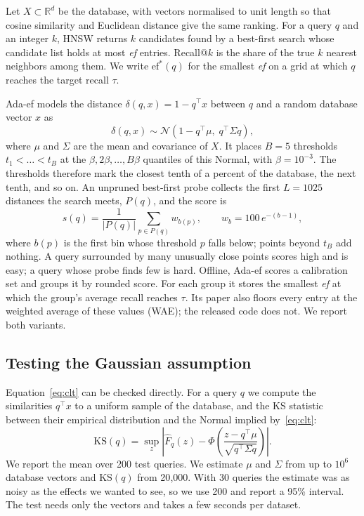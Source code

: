 \documentclass[10pt,journal,compsoc]{IEEEtran}
\makeatletter
\newcommand{\ef}{\textit{ef}}
\newcommand{\KS}{\mathrm{KS}}
\renewcommand\paragraph{\@startsection{paragraph}{4}{\z@}{1.5ex plus 1ex minus .2ex}{-1em}{\normalfont\normalsize\itshape}}
\makeatother
\begin{document}
Let $X \subset \mathbb{R}^d$ be the database, with vectors normalised to unit length so that
cosine similarity and Euclidean distance give the same ranking. For a query $q$ and an integer $k$,
HNSW returns $k$ candidates found by a best-first search whose candidate list holds at most \ef{}
entries. Recall@$k$ is the share of the true $k$ nearest neighbors among them. We write
$\mathrm{ef}^*(q)$ for the smallest \ef{} on a grid at which $q$ reaches the target recall $\tau$.

\paragraph{Ada-ef's score.}
Ada-ef models the distance $\delta(q,x) = 1 - q^\top x$ between $q$ and a random database vector
$x$ as
\begin{equation}
  \delta(q,x) \sim \mathcal{N}\!\left(1 - q^\top\mu,\; q^\top \Sigma q\right),
  \label{eq:clt}
\end{equation}
where $\mu$ and $\Sigma$ are the mean and covariance of $X$. It places $B = 5$ thresholds
$t_1 < \dots < t_B$ at the $\beta, 2\beta, \dots, B\beta$ quantiles of this Normal, with
$\beta = 10^{-3}$. The thresholds therefore mark the closest tenth of a percent of the database, the
next tenth, and so on. An unpruned best-first probe collects the first $L = 1025$ distances the
search meets, $P(q)$, and the score is
\begin{equation}
  s(q) = \frac{1}{|P(q)|} \sum_{p \in P(q)} w_{b(p)}, \qquad w_b = 100\, e^{-(b-1)},
  \label{eq:score}
\end{equation}
where $b(p)$ is the first bin whose threshold $p$ falls below; points beyond $t_B$ add nothing. A
query surrounded by many unusually close points scores high and is easy; a query whose probe finds
few is hard. Offline, Ada-ef scores a calibration set and groups it by rounded score. For each group
it stores the smallest \ef{} at which the group's average recall reaches $\tau$. Its paper also
floors every entry at the weighted average of these values (WAE); the released code does not. We
report both variants.

\subsection{Testing the Gaussian assumption}

Equation~\eqref{eq:clt} can be checked directly. For a query $q$ we compute the similarities
$q^\top x$ to a uniform sample of the database, and the KS statistic between their empirical
distribution and the Normal implied by~\eqref{eq:clt}:
\begin{equation}
  \KS(q) = \sup_z \left| \hat F_q(z) - \Phi\!\left(\frac{z - q^\top\mu}{\sqrt{q^\top\Sigma q}}\right) \right| .
\end{equation}
We report the mean over 200 test queries. We estimate $\mu$ and $\Sigma$ from up to $10^6$ database
vectors and $\KS(q)$ from 20{,}000. With 30 queries the estimate was as noisy as the effects we
wanted to see, so we use 200 and report a 95\% interval. The test needs only the vectors and takes a
few seconds per dataset.
\end{document}
